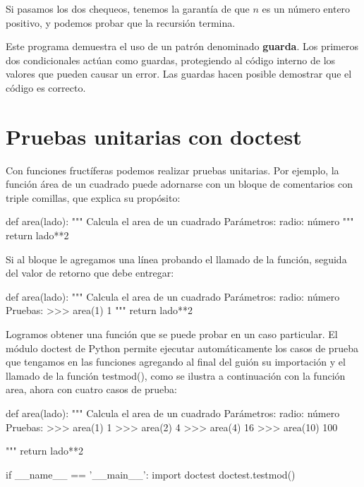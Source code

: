 Si pasamos los dos chequeos, tenemos la garantía de que $n$ es un
número entero positivo, y podemos probar que la recursión termina.

Este programa demuestra el uso de un patrón denominado \textbf{guarda}.
Los primeros dos condicionales actúan como guardas, protegiendo al
código interno de los valores que pueden causar un error. Las guardas
hacen posible demostrar que el código es correcto.

\section{Pruebas unitarias con doctest}

Con funciones fructíferas podemos realizar pruebas unitarias. Por
ejemplo, la función área de un cuadrado puede adornarse con un bloque
de comentarios con triple comillas, que explica su propósito:

\begin{pythoncode}
def area(lado):
    """ Calcula el area de un cuadrado
        Parámetros:
            radio: número
    """
    return lado**2
\end{pythoncode}
 

Si al bloque le agregamos una línea probando el llamado de la función,
seguida del valor de retorno que debe entregar:

\begin{pythoncode}
def area(lado):
    """ Calcula el area de un cuadrado
        Parámetros:
            radio: número
        Pruebas:
        >>> area(1)
        1        
    """
    return lado**2
\end{pythoncode}

Logramos obtener una función que se puede probar en un caso particular.
El módulo doctest de Python permite ejecutar automáticamente los casos
de prueba que tengamos en las funciones agregando al final del guión
su importación y el llamado de la función testmod(), como se ilustra
a continuación con la función area, ahora con cuatro casos de prueba:

\begin{pythoncode}
def area(lado):
    """ Calcula el area de un cuadrado
        Parámetros:
            radio: número
        Pruebas:
        >>> area(1)
        1
        >>> area(2)
        4
        >>> area(4)
        16
        >>> area(10)
        100
        
    """
    return lado**2

if __name__ == '__main__':
    import doctest
    doctest.testmod()
\end{pythoncode}

